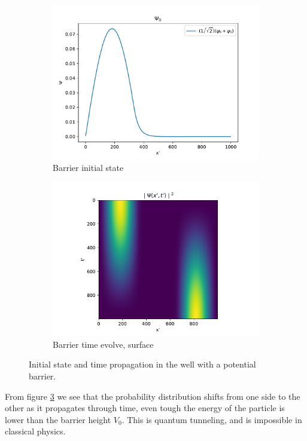 \documentclass{article}
\begin{document}
\begin{figure}[H]
    \begin{subfigure}[b]{0.5\textwidth}
        \includegraphics[width=\linewidth]{./media/initial_state.pdf}
        \caption{Barrier initial state}
        \label{fig:barrier-initial-state}
    \end{subfigure}
    \begin{subfigure}[b]{0.5\textwidth}
        \includegraphics[width=\linewidth]{./media/time_evolve_surface.pdf}
        \caption{Barrier time evolve, surface}
        \label{fig:barrier-evolve-surface}
    \end{subfigure}
    \caption{Initial state and time propagation in the well with a potential barrier.}
\end{figure}
From figure \ref{fig:barrier-evolve-surface} we see that the probability distribution shifts from one side to the other as it propagates through time, even tough the energy of the particle is lower than the barrier height $V_0$. This is quantum tunneling, and is impossible in classical physics.
\end{document}

